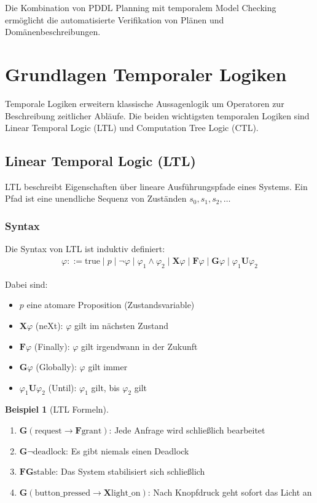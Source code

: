 ﻿\documentclass[a4paper,12pt]{article}
\theoremstyle{definition}
\newtheorem{beispiel}{Beispiel}[section]
\begin{document}
Die Kombination von PDDL Planning mit temporalem Model Checking ermöglicht die automatisierte Verifikation von Plänen und Domänenbeschreibungen.

\section{Grundlagen Temporaler Logiken}

Temporale Logiken erweitern klassische Aussagenlogik um Operatoren zur Beschreibung zeitlicher Abläufe. Die beiden wichtigsten temporalen Logiken sind Linear Temporal Logic (LTL) und Computation Tree Logic (CTL).

\subsection{Linear Temporal Logic (LTL)}

LTL beschreibt Eigenschaften über lineare Ausführungspfade eines Systems. Ein Pfad ist eine unendliche Sequenz von Zuständen $s_0, s_1, s_2, \ldots$

\subsubsection{Syntax}

Die Syntax von LTL ist induktiv definiert:
\begin{align}
\varphi ::= \text{true} \mid p \mid \neg \varphi \mid \varphi_1 \land \varphi_2 \mid \mathbf{X}\varphi \mid \mathbf{F}\varphi \mid \mathbf{G}\varphi \mid \varphi_1 \mathbf{U} \varphi_2
\end{align}

Dabei sind:
\begin{itemize}
	\item[-] $p$ eine atomare Proposition (Zustandsvariable)
	\item[-] $\mathbf{X}\varphi$ (neXt): $\varphi$ gilt im nächsten Zustand
	\item[-] $\mathbf{F}\varphi$ (Finally): $\varphi$ gilt irgendwann in der Zukunft
	\item[-] $\mathbf{G}\varphi$ (Globally): $\varphi$ gilt immer
	\item[-] $\varphi_1 \mathbf{U} \varphi_2$ (Until): $\varphi_1$ gilt, bis $\varphi_2$ gilt
\end{itemize}

\begin{beispiel}[LTL Formeln]
	\begin{enumerate}
		\item $\mathbf{G}(\text{request} \to \mathbf{F}\text{grant})$: Jede Anfrage wird schließlich bearbeitet
		\item $\mathbf{G}\neg\text{deadlock}$: Es gibt niemals einen Deadlock
		\item $\mathbf{F}\mathbf{G}\text{stable}$: Das System stabilisiert sich schließlich
		\item $\mathbf{G}(\text{button\_pressed} \to \mathbf{X}\text{light\_on})$: Nach Knopfdruck geht sofort das Licht an
	\end{enumerate}
\end{beispiel}
\end{document}

